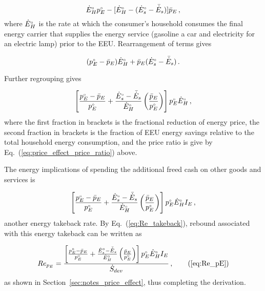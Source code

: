 \begin{equation}
  {}{\dot{E}}^{\scriptscriptstyle \circ}_H {}{p}^{\scriptscriptstyle \circ}_E - [{}{\dot{E}}^{\scriptscriptstyle \circ}_H - ({}{\dot{E}}^{\scriptscriptstyle \circ}_s - \bar{\dot{E}}_s)] \bar{p}_E \, ,
\end{equation}
%
where ${}{\dot{E}}^{\scriptscriptstyle \circ}_H$ is the rate at which the consumer's household 
consumes the final energy carrier that supplies
the energy service
(gasoline a car and
electricity for an electric lamp) 
prior to the EEU.
Rearrangement of terms gives

\begin{equation}
  ({}{p}^{\scriptscriptstyle \circ}_E - \bar{p}_E) {}{\dot{E}}^{\scriptscriptstyle \circ}_H + \bar{p}_E ({}{\dot{E}}^{\scriptscriptstyle \circ}_s - \bar{\dot{E}}_s) \, .
\end{equation}

Further regrouping gives

\begin{equation}
  \left[ \frac{{}{p}^{\scriptscriptstyle \circ}_E - \bar{p}_E}{{}{p}^{\scriptscriptstyle \circ}_E}
         + \frac{{}{\dot{E}}^{\scriptscriptstyle \circ}_s - \bar{\dot{E}}_s}{{}{\dot{E}}^{\scriptscriptstyle \circ}_H} 
              \left( \frac{\bar{p}_E}{{}{p}^{\scriptscriptstyle \circ}_E} \right) \right] 
                             {}{p}^{\scriptscriptstyle \circ}_E {}{\dot{E}}^{\scriptscriptstyle \circ}_H \, ,
\end{equation}
%
where the first fraction in brackets is the fractional reduction 
of energy price, 
the second fraction in brackets is the fraction of
EEU energy savings relative to
the total household energy consumption, and 
the price ratio is give by Eq.~(\ref{eq:price_effect_price_ratio}) above.

The energy implications of spending the additional freed cash
on other goods and services is

\begin{equation}
  \left[ \frac{{}{p}^{\scriptscriptstyle \circ}_E - \bar{p}_E}{{}{p}^{\scriptscriptstyle \circ}_E}
         + \frac{{}{\dot{E}}^{\scriptscriptstyle \circ}_s - \bar{\dot{E}}_s}{{}{\dot{E}}^{\scriptscriptstyle \circ}_H} 
              \left( \frac{\bar{p}_E}{{}{p}^{\scriptscriptstyle \circ}_E} \right) \right] 
                             {}{p}^{\scriptscriptstyle \circ}_E {}{\dot{E}}^{\scriptscriptstyle \circ}_H I_E \, ,
\end{equation}
%
another energy takeback rate.
By Eq.~(\ref{eq:Re_takeback}),
rebound associated with this energy takeback
can be written as

\begin{equation}
  Re_{p_E} = \frac{\left[ \frac{\orig{p}_E - \ainc{p}_E}{\orig{p}_E}
         + \frac{\rorig{E}_s - \rainc{E}_s}{\rorig{E}_H} 
              \left( \frac{\ainc{p}_E}{\orig{p}_E} \right) \right] 
                             \orig{p}_E \rorig{E}_H I_E}{\Sdot} \, , \tag{\ref{eq:Re_pE}}
\end{equation}
%
as shown in Section~\ref{sec:notes_price_effect},
thus completing the derivation.



